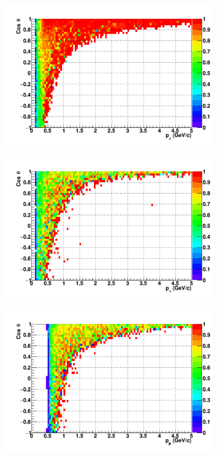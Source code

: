\begin{figure}
  \centering
    \begin{subfigure}{.49\textwidth}
    \includegraphics[width=\linewidth]{fig/Efficiency_Muon.pdf}
  \end{subfigure}
    \begin{subfigure}{.49\textwidth}
    \includegraphics[width=\linewidth]{fig/Efficiency_Pion.pdf}
  \end{subfigure}
    \begin{subfigure}{.49\textwidth}
    \includegraphics[width=\linewidth]{fig/Efficiency_Proton.pdf}

\end{subfigure}
\end{figure}
